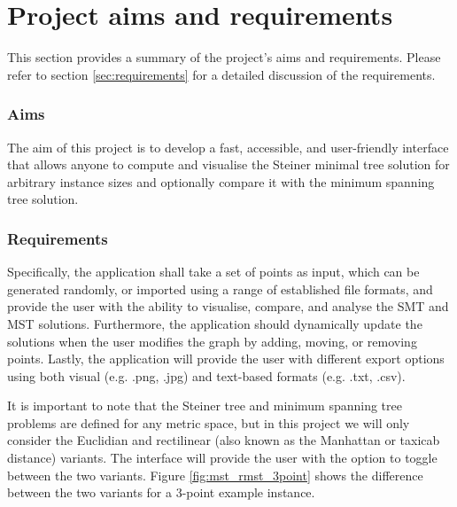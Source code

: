 \documentclass{l4proj}
\begin{document}


\section{Project aims and requirements}
This section provides a summary of the project's aims and requirements. Please refer to section \ref{sec:requirements} for a detailed discussion of the requirements.

\subsubsection{Aims}
The aim of this project is to develop a fast, accessible, and user-friendly interface that allows anyone to compute and visualise the Steiner minimal tree solution for arbitrary instance sizes and optionally compare it with the minimum spanning tree solution.

\subsubsection{Requirements}
Specifically, the application shall take a set of points as input, which can be generated randomly, or imported using a range of established file formats, and provide the user with the ability to visualise, compare, and analyse the SMT and MST solutions.
Furthermore, the application should dynamically update the solutions when the user modifies the graph by adding, moving, or removing points.
Lastly, the application will provide the user with different export options using both visual (e.g. .png, .jpg) and text-based formats (e.g. .txt, .csv).

It is important to note that the Steiner tree and minimum spanning tree problems are defined for any metric space, but in this project we will only consider the Euclidian and rectilinear (also known as the Manhattan or taxicab distance) variants. The interface will provide the user with the option to toggle between the two variants. Figure \ref{fig:mst_rmst_3point} shows the difference between the two variants for a 3-point example instance.
\end{document}
